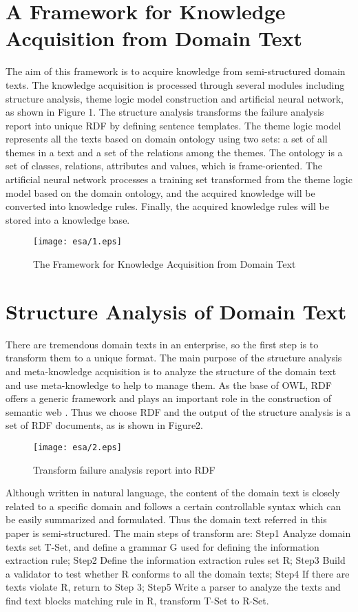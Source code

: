 \documentclass{elsarticle}
\begin{document}
\section{A Framework for Knowledge Acquisition from Domain Text
}
\label{sec:fram-knowl-acqu}

The aim of this framework is to acquire knowledge from semi-structured
domain texts. The knowledge acquisition is processed through several
modules including structure analysis, theme logic model construction
and artificial neural network, as shown in Figure 1. The structure
analysis transforms the failure analysis report into unique RDF by
defining sentence templates. The theme logic model represents all the
texts based on domain ontology using two sets: a set of all themes in
a text and a set of the relations among the themes. The ontology is a set of classes, relations, attributes and
values, which is frame-oriented. The artificial neural network processes a training set
transformed from the theme logic model based on the domain ontology,
and the acquired knowledge will be converted into knowledge rules. Finally, the acquired knowledge rules will be
stored into a knowledge base.
\begin{figure}[htp]
  \centering
  \texttt{[image: esa/1.eps]}

  \caption{The Framework for Knowledge Acquisition from Domain Text}
  \label{fig:1}
\end{figure}

\section{Structure Analysis of Domain Text 
}
\label{sec:struct-analys-doma}

There are tremendous domain texts in an enterprise, so the first step
is to transform them to a unique format. The main purpose of the
structure analysis and meta-knowledge acquisition is to analyze the
structure of the domain text and use meta-knowledge to help to manage
them. As the base of OWL, RDF offers a generic framework and plays an
important role in the construction of semantic web \cite{lassila1999rdf}. Thus we
choose RDF and the output of the structure analysis is a set of RDF
documents, as is shown in Figure2. 
\begin{figure}[htp]
  \centering
  \texttt{[image: esa/2.eps]}

  \caption{Transform failure analysis report into RDF}
  \label{fig:2}
\end{figure}
Although written in natural language, the content of the domain text is closely related to a specific domain and follows a certain controllable syntax which can be easily summarized and formulated. Thus the domain text referred in this paper is semi-structured. The main steps of transform are:
Step1 Analyze domain texts set T-Set, and define a grammar G used for defining the information extraction rule;
Step2 Define the information extraction rules set R;
Step3 Build a validator to test whether R conforms to all the domain texts;
Step4 If there are texts violate R, return to Step 3;
Step5 Write a parser to analyze the texts and find text blocks
matching rule in R, transform T-Set to R-Set.  
\end{document}
